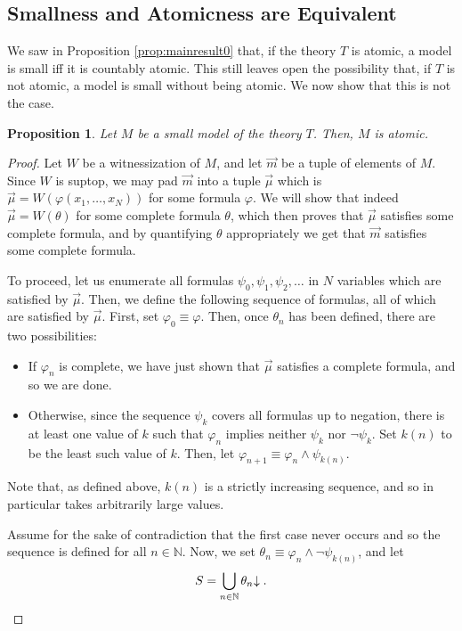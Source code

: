 \documentclass{article}
\newtheorem{prop}[theorem]{Proposition}
\theoremstyle{nonumberplain}
\newtheorem{proof}{Proof}
\newcommand{\N}{\mathbb{N}}
\newcommand{\dncl}[1]{{#1}\hspace{-0.25em}\downarrow}
\begin{document}
\subsection{Smallness and Atomicness are Equivalent}\label{sec:mainresult}

We saw in Proposition \ref{prop:mainresult0} that, if the theory $T$ is atomic, a model is small iff it is countably atomic. This still leaves open the possibility that, if $T$ is not atomic, a model is small without being atomic. We now show that this is not the case.

\begin{prop}\label{prop:mainresult}
Let $M$ be a small model of the theory $T$. Then, $M$ is atomic.
\end{prop}

\begin{proof}
Let $W$ be a witnessization of $M$, and let $\vec m$ be a tuple of elements of $M$. Since $W$ is suptop, we may pad $\vec m$ into a tuple $\vec\mu$ which is $\vec\mu = W(\varphi(x_1, \dots, x_N))$ for some formula $\varphi$. We will show that indeed $\vec\mu = W(\theta)$ for some complete formula $\theta$, which then proves that $\vec\mu$ satisfies some complete formula, and by quantifying $\theta$ appropriately we get that $\vec m$ satisfies some complete formula.

To proceed, let us enumerate all formulas $\psi_0, \psi_1, \psi_2, \dots$ in $N$ variables which are satisfied by $\vec\mu$. Then, we define the following sequence of formulas, all of which are satisfied by $\vec\mu$. First, set $\varphi_0 \equiv \varphi$. Then, once $\theta_n$ has been defined, there are two possibilities:
\begin{itemize}
\item If $\varphi_n$ is complete, we have just shown that $\vec\mu$ satisfies a complete formula, and so we are done.
\item Otherwise, since the sequence $\psi_k$ covers all formulas up to negation, there is at least one value of $k$ such that $\varphi_n$ implies neither $\psi_k$ nor $\neg\psi_k$. Set $k(n)$ to be the least such value of $k$. Then, let $\varphi_{n+1} \equiv \varphi_n \land \psi_{k(n)}$.
\end{itemize}

Note that, as defined above, $k(n)$ is a strictly increasing sequence, and so in particular takes arbitrarily large values.

Assume for the sake of contradiction that the first case never occurs and so the sequence is defined for all $n \in \N$. Now, we set $\theta_n \equiv \varphi_n \land \neg\psi_{k(n)}$, and let
\begin{equation}
S = \bigcup_{n \in \N} \dncl{\theta_n}.
\end{equation}


\end{proof}
\end{document}
